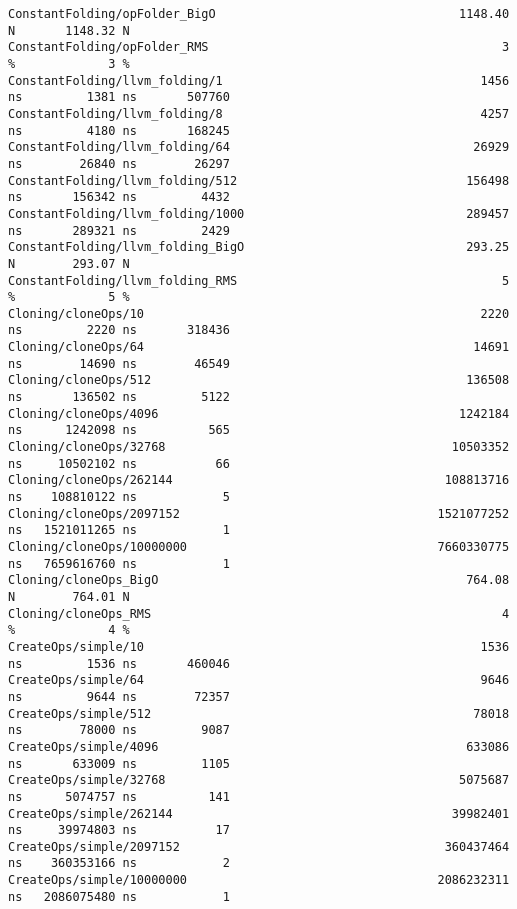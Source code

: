 \begin{code}
\begin{verbatim}
ConstantFolding/opFolder_BigO                                  1148.40 N       1148.32 N
ConstantFolding/opFolder_RMS                                         3 %             3 %
ConstantFolding/llvm_folding/1                                    1456 ns         1381 ns       507760
ConstantFolding/llvm_folding/8                                    4257 ns         4180 ns       168245
ConstantFolding/llvm_folding/64                                  26929 ns        26840 ns        26297
ConstantFolding/llvm_folding/512                                156498 ns       156342 ns         4432
ConstantFolding/llvm_folding/1000                               289457 ns       289321 ns         2429
ConstantFolding/llvm_folding_BigO                               293.25 N        293.07 N
ConstantFolding/llvm_folding_RMS                                     5 %             5 %
Cloning/cloneOps/10                                               2220 ns         2220 ns       318436
Cloning/cloneOps/64                                              14691 ns        14690 ns        46549
Cloning/cloneOps/512                                            136508 ns       136502 ns         5122
Cloning/cloneOps/4096                                          1242184 ns      1242098 ns          565
Cloning/cloneOps/32768                                        10503352 ns     10502102 ns           66
Cloning/cloneOps/262144                                      108813716 ns    108810122 ns            5
Cloning/cloneOps/2097152                                    1521077252 ns   1521011265 ns            1
Cloning/cloneOps/10000000                                   7660330775 ns   7659616760 ns            1
Cloning/cloneOps_BigO                                           764.08 N        764.01 N
Cloning/cloneOps_RMS                                                 4 %             4 %
CreateOps/simple/10                                               1536 ns         1536 ns       460046
CreateOps/simple/64                                               9646 ns         9644 ns        72357
CreateOps/simple/512                                             78018 ns        78000 ns         9087
CreateOps/simple/4096                                           633086 ns       633009 ns         1105
CreateOps/simple/32768                                         5075687 ns      5074757 ns          141
CreateOps/simple/262144                                       39982401 ns     39974803 ns           17
CreateOps/simple/2097152                                     360437464 ns    360353166 ns            2
CreateOps/simple/10000000                                   2086232311 ns   2086075480 ns            1

\end{verbatim}
\end{code}
